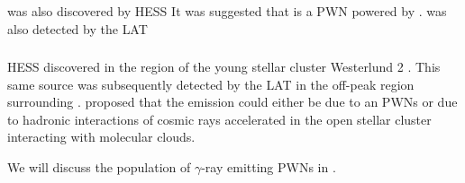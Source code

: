 \subsubsection{}

 was also discovered by \ac{HESS}
\cite{aharonian_2008a_very-high-energy-gamma-ray}
It was suggested that  is a \ac{PWN} powered by
 \cite{hessels_2008a_j18560245:-arecibo}.
 was also detected by the \ac{LAT}

\subsubsection{}

\ac{HESS} discovered  in the region of the young stellar
cluster Westerlund 2 \cite{aharonian_2007a_detection-extended}.  This same
source was subsequently detected by the \ac{LAT} in the off-peak region
surrounding  \citep{ackermann_2011a_fermi-lat-search}.
\cite{h.e.s.s.collaboration_2011a_revisiting-westerlund} proposed that
the emission could either be due to an \acp{PWN} or due to hadronic
interactions of cosmic rays accelerated in the open stellar cluster
interacting with molecular clouds.

We will discuss the population of $\gamma$-ray emitting \acp{PWN}
in .
